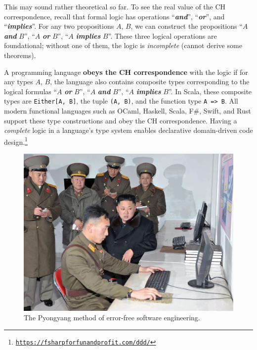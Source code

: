 This may sound rather theoretical so far. To see the real value of
the CH correspondence, recall that formal logic has operations \textsf{``}\textbf{\emph{and}}\textsf{''},
\textsf{``}\textbf{\emph{or}}\textsf{''}, and \textsf{``}\textbf{\emph{implies}}\textsf{''}. For any
two propositions $A$, $B$, we can construct the propositions \textsf{``}$A$
\textbf{\emph{and}} $B$\textsf{''}, \textsf{``}$A$ \textbf{\emph{or}} $B$\textsf{''}, \textsf{``}$A$
\textbf{\emph{implies}} $B$\textsf{''}. These three logical operations are
foundational; without one of them, the logic is \emph{incomplete}
(cannot derive some theorems).

A programming language \textbf{obeys the CH correspondence}
with the logic if for any types $A$, $B$, the language also contains
composite types corresponding to the logical formulas \textsf{``}$A$ \textbf{\emph{or}}
$B$\textsf{''}, \textsf{``}$A$ \textbf{\emph{and}} $B$\textsf{''}, \textsf{``}$A$ \textbf{\emph{implies}}
$B$\textsf{''}. In Scala, these composite types are \lstinline!Either[A, B]!,
the tuple \lstinline!(A, B)!, and the function type \lstinline!A => B!.
All modern functional languages such as OCaml, Haskell, Scala, F\#,
Swift, and Rust support these type constructions and obey the CH correspondence.
Having a \emph{complete} logic in a language\textsf{'}s type system enables
declarative domain-driven code design.\footnote{\texttt{\href{https://fsharpforfunandprofit.com/ddd/}{https://fsharpforfunandprofit.com/ddd/}}}

\begin{figure}%
\begin{centering}
\vspace{-0.5\baselineskip}
\par\end{centering}
\vspace{-3\baselineskip}
\end{figure}%

\begin{figure}

\begin{centering}
\includegraphics[width=0.5\linewidth]{no-bugs}
\par\end{centering}
\caption{The Pyongyang method of error-free software engineering.\label{fig:The-Pyongyang-method-of-error-free-programming-1}}

\end{figure}

